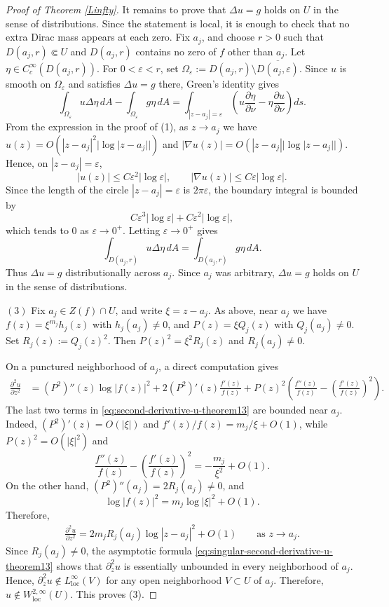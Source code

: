 \documentclass[12pt,twoside]{amsart}
\numberwithin{equation}{section}
\numberwithin{definition}{section} %
\begin{document}
\begin{proof}[Proof of Theorem \ref{Linfty}]
It remains to prove that $\Delta u=g$ holds on $U$ in the sense of distributions. Since
the statement is local, it is enough to check that no extra Dirac mass appears at each zero.
Fix $a_j$, and choose $r>0$ such that $D(a_j,r)\Subset U$ and $D(a_j,r)$ contains no zero of
$f$ other than $a_j$. Let $\eta\in C_c^\infty(D(a_j,r))$. For $0<\varepsilon<r$, set
$\Omega_\varepsilon:=D(a_j,r)\setminus\overline{D(a_j,\varepsilon)}$. Since $u$ is smooth on
$\Omega_\varepsilon$ and satisfies $\Delta u=g$ there, Green's identity gives
$$
\int_{\Omega_\varepsilon}u\Delta\eta\,dA
-
\int_{\Omega_\varepsilon}g\eta\,dA
=
\int_{|z-a_j|=\varepsilon}
\left(
u\frac{\partial\eta}{\partial\nu}
-
\eta\frac{\partial u}{\partial\nu}
\right)ds.
$$
From the expression in the proof of (1), as $z\to a_j$ we have
$u(z)=O(|z-a_j|^2|\log|z-a_j||)$ and
$|\nabla u(z)|=O(|z-a_j||\log|z-a_j||)$. Hence, on $|z-a_j|=\varepsilon$,
$$
|u(z)|\le C\varepsilon^2|\log\varepsilon|,
\qquad
|\nabla u(z)|\le C\varepsilon|\log\varepsilon|.
$$
Since the length of the circle $|z-a_j|=\varepsilon$ is $2\pi\varepsilon$, the boundary integral
is bounded by
$$
C\varepsilon^3|\log\varepsilon|+C\varepsilon^2|\log\varepsilon|,
$$
which tends to $0$ as $\varepsilon\to0^+$. Letting $\varepsilon\to0^+$ gives
$$
\int_{D(a_j,r)}u\Delta\eta\,dA
=
\int_{D(a_j,r)}g\eta\,dA.
$$
Thus $\Delta u=g$ distributionally across $a_j$. Since $a_j$ was arbitrary, $\Delta u=g$ holds
on $U$ in the sense of distributions.

$(3)$
Fix $a_j\in Z(f)\cap U$, and write $\xi=z-a_j$. As above, near $a_j$ we have
$f(z)=\xi^{m_j}h_j(z)$ with $h_j(a_j)\neq0$, and $P(z)=\xi Q_j(z)$ with
$Q_j(a_j)\neq0$. Set $R_j(z):=Q_j(z)^2$. Then $P(z)^2=\xi^2R_j(z)$ and
$R_j(a_j)\neq0$.

On a punctured neighborhood of $a_j$, a direct computation gives
\begin{align}
\frac{\partial^2 u}{\partial z^2}
&=
(P^2)''(z)\log|f(z)|^2
+
2(P^2)'(z)\frac{f'(z)}{f(z)}
+
P(z)^2
\left(
\frac{f''(z)}{f(z)}
-
\left(\frac{f'(z)}{f(z)}\right)^2
\right).
\label{eq:second-derivative-u-theorem13}
\end{align}
The last two terms in \eqref{eq:second-derivative-u-theorem13} are bounded near $a_j$.
Indeed, $(P^2)'(z)=O(|\xi|)$ and $f'(z)/f(z)=m_j/\xi+O(1)$, while $P(z)^2=O(|\xi|^2)$ and
$$
\frac{f''(z)}{f(z)}
-
\left(\frac{f'(z)}{f(z)}\right)^2
=
-\frac{m_j}{\xi^2}+O(1).
$$
On the other hand, $(P^2)''(a_j)=2R_j(a_j)\neq0$, and
$$
\log|f(z)|^2
=
m_j\log|\xi|^2+O(1).
$$
Therefore,
\begin{align}
\frac{\partial^2 u}{\partial z^2}
=
2m_jR_j(a_j)\log|z-a_j|^2+O(1)
\qquad \text{as } z\to a_j.
\label{eq:singular-second-derivative-u-theorem13}
\end{align}
Since $R_j(a_j)\neq0$, the asymptotic formula
\eqref{eq:singular-second-derivative-u-theorem13} shows that $\partial_z^2u$ is essentially unbounded in every neighborhood of $a_j$. Hence, $\partial_z^2u\notin L^\infty_{\mathrm{loc}}(V)$ for any open neighborhood
$V\subset U$ of $a_j$.
Therefore,
$u\notin W^{2,\infty}_{\mathrm{loc}}(U)$. This proves (3).
\end{proof}
\end{document}
